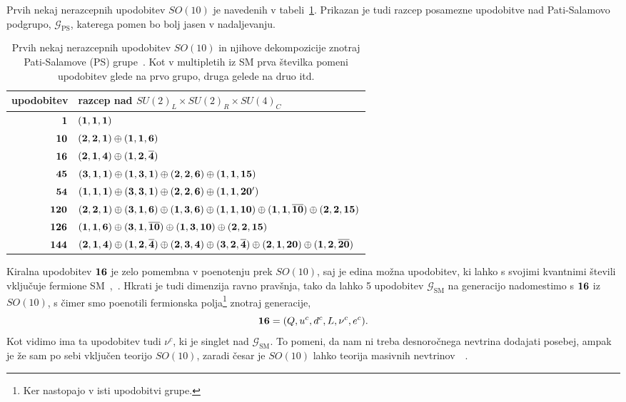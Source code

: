 Prvih nekaj nerazcepnih upodobitev $SO(10)$ je navedenih v tabeli~\ref{irreps}. Prikazan je tudi
razcep posamezne upodobitve nad Pati-Salamovo podgrupo, $\mathcal{G}_\text{PS}$, katerega pomen
bo bolj jasen v nadaljevanju.
\begin{table}[H]\centering
	\caption{Prvih nekaj nerazcepnih upodobitev $SO(10)$ in njihove dekompozicije znotraj
	Pati-Salamove (PS) grupe~\cite{slansky}. Kot v multipletih iz SM prva številka pomeni upodobitev glede
	na prvo grupo, druga gelede na druo itd.}
	\begin{tabular}{r|l}
		upodobitev & razcep nad $SU(2)_L\times SU(2)_R \times SU(4)_C$ \\
		\hline
		$\mathbf{1}$ & $(\mathbf{1}, \mathbf{1}, \mathbf{1})$ \\
		$\mathbf{10}$ & $(\mathbf{2}, \mathbf{2}, \mathbf{1}) \oplus (\mathbf{1}, \mathbf{1}, \mathbf{6})$ \\
		$\mathbf{16}$ & $(\mathbf{2}, \mathbf{1}, \mathbf{4}) \oplus (\mathbf{1}, \mathbf{2}, \overline{\mathbf{4}})$ \\
		$\mathbf{45}$ & $(\mathbf{3}, \mathbf{1}, \mathbf{1}) \oplus (\mathbf{1}, \mathbf{3}, \mathbf{1}) \oplus (\mathbf{2}, \mathbf{2}, \mathbf{6})
				\oplus (\mathbf{1}, \mathbf{1}, \mathbf{15})$ \\
		$\mathbf{54}$ & $(\mathbf{1}, \mathbf{1}, \mathbf{1}) \oplus (\mathbf{3}, \mathbf{3}, \mathbf{1}) \oplus (\mathbf{2}, \mathbf{2}, \mathbf{6}) \oplus
				(\mathbf{1}, \mathbf{1}, \mathbf{20'})$ \\
		$\mathbf{120}$ & $(\mathbf{2}, \mathbf{2}, \mathbf{1}) \oplus (\mathbf{3}, \mathbf{1}, \mathbf{6}) \oplus (\mathbf{1}, \mathbf{3}, \mathbf{6}) 
			\oplus (\mathbf{1}, \mathbf{1}, \mathbf{10}) \oplus (\mathbf{1}, \mathbf{1}, \overline{\mathbf{10}}) \oplus (\mathbf{2}, \mathbf{2}, \mathbf{15})$ \\
		$\mathbf{126}$ & $(\mathbf{1}, \mathbf{1}, \mathbf{6}) \oplus (\mathbf{3}, \mathbf{1}, \overline{\mathbf{10}}) \oplus (\mathbf{1}, \mathbf{3}, \mathbf{10})
				\oplus (\mathbf{2}, \mathbf{2}, \mathbf{15})$ \\
		$\mathbf{144}$ & $(\mathbf{2}, \mathbf{1}, \mathbf{4}) \oplus (\mathbf{1}, \mathbf{2}, \overline{\mathbf{4}}) \oplus (\mathbf{2}, \mathbf{3}, \mathbf{4})
				\oplus (\mathbf{3}, \mathbf{2}, \overline{\mathbf{4}}) \oplus (\mathbf{2}, \mathbf{1}, \mathbf{20}) \oplus (\mathbf{1}, \mathbf{2}, \overline{\mathbf{20}})$
	\end{tabular}
	\label{irreps}
\end{table}

Kiralna upodobitev $\mathbf{16}$ je zelo pomembna v poenotenju prek $SO(10)$, saj je edina možna
upodobitev, ki lahko s svojimi kvantnimi števili vključuje fermione SM~\cite{mohapatra},~\cite{oezer}.
Hkrati je tudi dimenzija ravno pravšnja, tako da lahko 5 upodobitev $\mathcal{G}_\text{SM}$ na generacijo
nadomestimo s $\mathbf{16}$ iz $SO(10)$, s čimer smo poenotili fermionska polja\footnote{Ker nastopajo v isti
upodobitvi grupe.} znotraj generacije,
\begin{equation}
	\mathbf{16} = (Q, u^c, d^c, L, \nu^c, e^c).
	\label{opis16}
\end{equation}
Kot vidimo ima ta upodobitev tudi $\nu^c$, ki je singlet nad $\mathcal{G}_\text{SM}$. To pomeni,
da nam ni treba desnoročnega nevtrina dodajati posebej, ampak je že sam po sebi vključen teorijo
$SO(10)$, zaradi česar je $SO(10)$ lahko teorija masivnih nevtrinov~\cite{mohapatra}~\cite{gutproton}.


